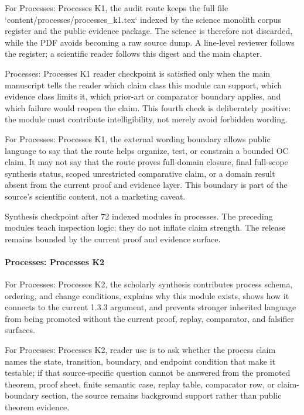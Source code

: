 For Processes: Processes K1, the audit route keeps the full file `content/processes/processes\_k1.tex` indexed by the science monolith corpus register and the public evidence package. The science is therefore not discarded, while the PDF avoids becoming a raw source dump. A line-level reviewer follows the register; a scientific reader follows this digest and the main chapter.


Processes: Processes K1 reader checkpoint is satisfied only when the main manuscript tells the reader which claim class this module can support, which evidence class limits it, which prior-art or comparator boundary applies, and which failure would reopen the claim. This fourth check is deliberately positive: the module must contribute intelligibility, not merely avoid forbidden wording.


For Processes: Processes K1, the external wording boundary allows public language to say that the route helps organize, test, or constrain a bounded OC claim. It may not say that the route proves full-domain closure, final full-scope synthesis status, scoped unrestricted comparative claim, or a domain result absent from the current proof and evidence layer. This boundary is part of the source's scientific content, not a marketing caveat.


Synthesis checkpoint after 72 indexed modules in processes. The preceding modules teach inspection logic; they do not inflate claim strength. The release remains bounded by the current proof and evidence surface.


\paragraph{Processes: Processes K2}

For Processes: Processes K2, the scholarly synthesis contributes process schema, ordering, and change conditions, explains why this module exists, shows how it connects to the current 1.3.3 argument, and prevents stronger inherited language from being promoted without the current proof, replay, comparator, and falsifier surfaces.


For Processes: Processes K2, reader use is to ask whether the process claim names the state, transition, boundary, and endpoint condition that make it testable; if that source-specific question cannot be answered from the promoted theorem, proof sheet, finite semantic case, replay table, comparator row, or claim-boundary section, the source remains background support rather than public theorem evidence.


